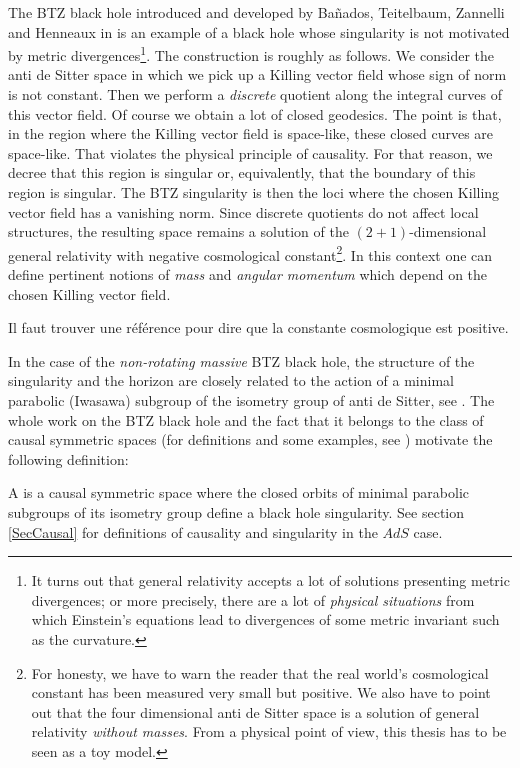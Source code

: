 The BTZ black hole introduced and developed by Bañados, Teitelbaum, Zannelli and Henneaux in \cite{BTZ_un,BTZ_deux} is an example of a black hole whose singularity is not motivated by metric divergences\footnote{It turns out that general relativity accepts a lot of solutions presenting metric divergences; or more precisely, there are a lot of \emph{physical situations} from which Einstein's equations lead to divergences of some metric invariant such as the curvature.}. The construction is roughly as follows. We consider the anti de Sitter space in which we pick up a Killing vector field whose sign of norm is not constant. Then we perform a \emph{discrete} quotient along the integral curves of this vector field. Of course we obtain a lot of closed geodesics. The point is that, in the region where the Killing vector field is space-like, these closed curves are space-like. That violates the physical principle of causality. For that reason, we decree that this region is singular or, equivalently, that the boundary of this region is singular. The BTZ singularity is then the loci where the chosen Killing vector field has a vanishing norm. Since discrete quotients do not affect local structures, the resulting space remains a solution of the $(2+1)$-dimensional general relativity with negative cosmological constant\footnote{For honesty, we have to warn the reader that the real world's cosmological constant has been measured very small but positive. We also have to point out that the four dimensional anti de Sitter space is a solution of general relativity \emph{without masses}. From a physical point of view, this thesis has to be seen as a toy model.}. In this context one can define pertinent notions of  \emph{mass} and \emph{angular momentum} which depend on the chosen Killing vector field.

\begin{probleme}
Il faut trouver une référence pour dire que la constante cosmologique est positive.
\end{probleme}

In the case of the \emph{non-rotating massive} BTZ black hole, the structure of the singularity and the horizon are closely related to the action of a minimal parabolic (Iwasawa) subgroup of the isometry group of anti de Sitter, see \cite{BTZB_deux,Keio}. The whole work on the BTZ black hole and the fact that it belongs to the class of causal symmetric spaces (for definitions and some examples, see \cite{HilgertOlaf}) motivate the following definition:

\begin{definition}
A  is a causal symmetric space where the closed orbits of minimal parabolic subgroups of its isometry group define a black hole singularity. See section \ref{SecCausal} for definitions of causality and singularity in the $AdS$ case.
\label{Def1}
\end{definition}

